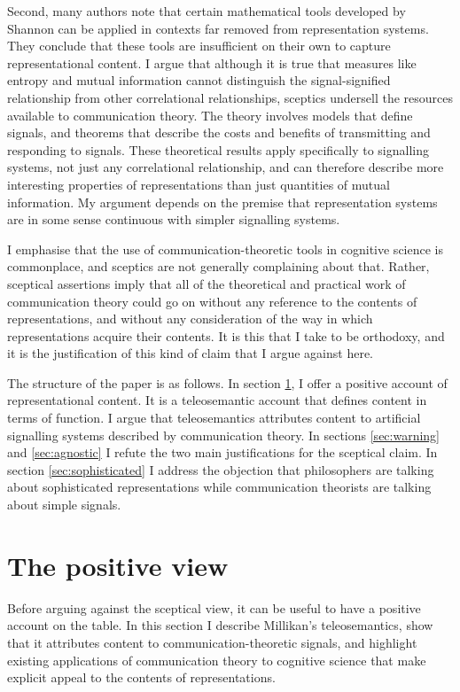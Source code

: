 \documentclass[12pt]{article}
\begin{document}
Second, many authors note that certain mathematical tools developed by Shannon can be applied in contexts far removed from representation systems.
They conclude that these tools are insufficient on their own to capture representational content.
I argue that although it is true that measures like entropy and mutual information cannot distinguish the signal-signified relationship from other correlational relationships, sceptics undersell the resources available to communication theory.
The theory involves models that define signals, and theorems that describe the costs and benefits of transmitting and responding to signals.
These theoretical results apply specifically to signalling systems, not just any correlational relationship, and can therefore describe more interesting properties of representations than just quantities of mutual information.
My argument depends on the premise that representation systems are in some sense continuous with simpler signalling systems.

I emphasise that the use of communication-theoretic tools in cognitive science is commonplace, and sceptics are not generally complaining about that.
Rather, sceptical assertions imply that all of the theoretical and practical work of communication theory could go on without any reference to the contents of representations, and without any consideration of the way in which representations acquire their contents.
It is this that I take to be orthodoxy, and it is the justification of this kind of claim that I argue against here.

The structure of the paper is as follows.
In section \ref{sec:positive}, I offer a positive account of representational content.
It is a teleosemantic account that defines content in terms of function.
I argue that teleosemantics attributes content to artificial signalling systems described by communication theory.
In sections \ref{sec:warning} and \ref{sec:agnostic} I refute the two main justifications for the sceptical claim.
In section \ref{sec:sophisticated} I address the objection that philosophers are talking about sophisticated representations while communication theorists are talking about simple signals.


\section{The positive view}\label{sec:positive}

Before arguing against the sceptical view, it can be useful to have a positive account on the table.
In this section I describe Millikan's teleosemantics, show that it attributes content to communication-theoretic signals, and highlight existing applications of communication theory to cognitive science that make explicit appeal to the contents of representations.
\end{document}
